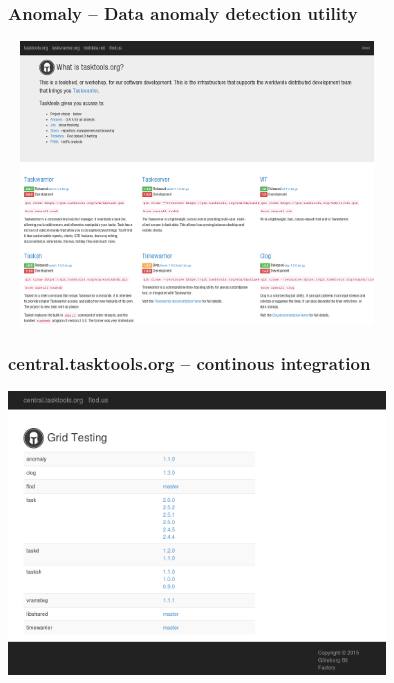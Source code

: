 \documentclass[t]{beamer}
\begin{document}
\begin{frame}\frametitle{Anomaly -- Data anomaly detection utility}
    \begin{center}
        \href{http://tasktools.org/projects/anomaly.html}{\includegraphics[width=10cm,height=7.5cm]{tasktools-org.png}}
    \end{center}
\end{frame}

\begin{frame}\frametitle{central.tasktools.org -- continous integration}
    \begin{center}
        \href{http://central.tasktools.org/}{\includegraphics[width=10cm,height=7.5cm]{central-tasktools-org.png}}
    \end{center}
\end{frame}
\end{document}
